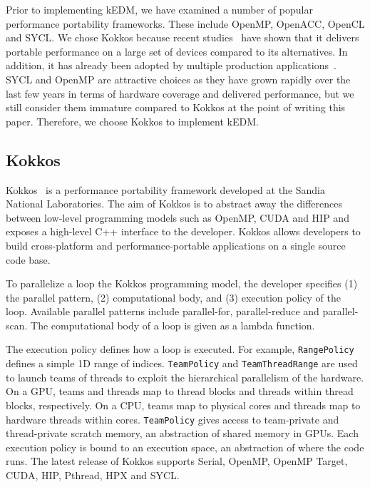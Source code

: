 \documentclass[sigconf]{acmart}
\begin{document}
Prior to implementing kEDM, we have examined a number of popular performance
portability frameworks. These include OpenMP, OpenACC, OpenCL and SYCL\@. We
chose Kokkos  because recent studies~\cite{Martineau2017, Deakin2019, Deakin2020}
have shown that it delivers portable performance on a large set of devices
compared to its alternatives. In addition, it has already been adopted by
multiple production applications~\cite{Sprague2020,Holmen2017,Demeshko2019}.
SYCL and OpenMP are attractive choices as they have grown rapidly over the
last few years in terms of hardware coverage and delivered performance, but we
still consider them immature compared to Kokkos at the point of writing this
paper. Therefore, we choose Kokkos to implement kEDM\@.

\subsection{Kokkos}

Kokkos~\cite{Edwards2014} is a performance portability framework developed at
the Sandia National Laboratories. The aim of Kokkos is to abstract away the
differences between low-level programming models such as OpenMP, CUDA and HIP
and exposes a high-level C++ interface to the developer. Kokkos allows
developers to build cross-platform and performance-portable applications on a
single source code base.

To parallelize a loop the Kokkos programming model, the developer specifies (1)
the parallel pattern, (2) computational body, and (3) execution policy of the
loop. Available parallel patterns include parallel-for, parallel-reduce and
parallel-scan. The computational body of a loop is given as a lambda function.

The execution policy defines how a loop is executed. For example,
\texttt{RangePolicy} defines a simple 1D range of indices. \texttt{TeamPolicy}
and \texttt{TeamThreadRange} are used to launch teams of threads to exploit
the hierarchical parallelism of the hardware. On a GPU, teams and threads map
to thread blocks and threads within thread blocks, respectively. On a CPU,
teams map to physical cores and threads map to hardware threads within cores.
\texttt{TeamPolicy} gives access to team-private and thread-private scratch
memory, an abstraction of shared memory in GPUs. Each execution policy is
bound to an execution space, an abstraction of where the code runs. The latest
release of Kokkos supports Serial, OpenMP, OpenMP Target, CUDA, HIP, Pthread,
HPX and SYCL\@.
\end{document}
